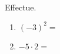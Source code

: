 %
%
    Effectue.
    \begin{enumerate}
        \item \((-3)^2 =\)
        \item \(-5 \cdot 2 = \)
    \end{enumerate}
